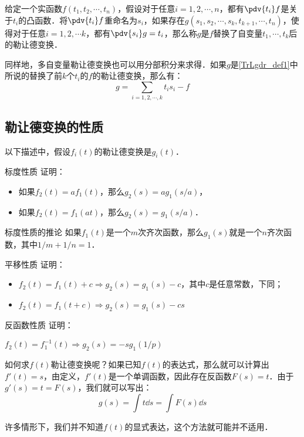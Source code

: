 \begin{definition}{}\label{TrLgdr_def1}
给定一个实函数$f(t_1, t_2, \cdots, t_n)$，假设对于任意$i=1, 2, \cdots, n$，都有$\pdv{t_i}f$是关于$t_i$的凸函数．将$\pdv{t_i}f$重命名为$s_i$，如果存在$g(s_1, s_2, \cdots, s_k, t_{k+1},\cdots, t_n)$，使得对于任意$i=1,2,\cdots k$，都有$\pdv{s_i}g=t_i$，那么称$g$是$f$替换了自变量$t_1, \cdots, t_k$后的勒让德变换．
\end{definition}

同样地，多自变量勒让德变换也可以用分部积分来求得．如果$g$是\autoref{TrLgdr_def1}中所说的替换了前$k$个$t_i$的$f$的勒让德变换，那么有：\begin{equation}\label{TrLgdr_eq1}
g=\sum\limits_{i=1,2,\cdots, k}t_is_i-f
\end{equation}

\subsection{勒让德变换的性质}

以下描述中，假设$f_i(t)$的勒让德变换是$g_i(t)$．

\begin{exercise}{标度性质}
证明：
\begin{itemize}
\item 如果$f_2(t)=af_1(t)$，那么$g_2(s)=ag_1(s/a)$，
\item 如果$f_2(t)=f_1(at)$，那么$g_2(s)=g_1(s/a)$．
\end{itemize}
\end{exercise}

\begin{corollary}{标度性质的推论}
如果$f_1(t)$是一个$m$次齐次函数，那么$g_1(s)$就是一个$n$齐次函数，其中$1/m+1/n=1$．
\end{corollary}

\begin{exercise}{平移性质}
证明：
\begin{itemize}
\item $f_2(t)=f_1(t)+c\Rightarrow g_2(s)=g_1(s)-c$，其中$c$是任意常数，下同；
\item $f_2(t)=f_1(t+c)\Rightarrow g_2(s)=g_1(s)-cs$
\end{itemize}
\end{exercise}

\begin{exercise}{反函数性质}
证明：

$f_2(t)=f_1^{-1}(t)\Rightarrow g_2(s)=-sg_1(1/p)$
\end{exercise}





如何求$f(t)$勒让德变换呢？如果已知$f(t)$的表达式，那么就可以计算出$f'(t)=s$，由定义，$f'(t)$是一个单调函数，因此存在反函数$F(s)=t$．由于$g'(s)=t=F(s)$，我们就可以写出：
\begin{equation}
g(s)=\int t \dd{s}=\int F(s) \dd{s}
\end{equation}

许多情形下，我们并不知道$f(t)$的显式表达，这个方法就可能并不适用．


